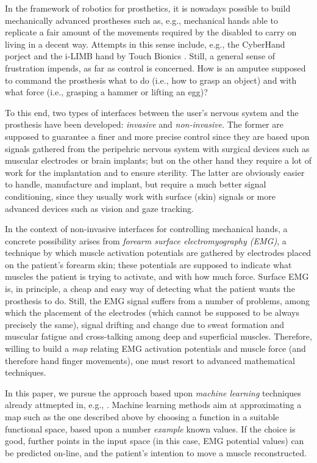 In the framework of robotics for prosthetics, it is nowadays possible
to build mechanically advanced prostheses such as, e.g., mechanical
hands able to replicate a fair amount of the movements required by the
disabled to carry on living in a decent way. Attempts in this sense
include, e.g., the CyberHand porject \cite{...} and the i-LIMB hand by
Touch Bionics \cite{}. Still, a general sense of frustration impends,
as far as control is concerned. How is an amputee supposed to command
the prosthesis what to do (i.e., how to grasp an object) and with what
force (i.e., grasping a hammer or lifting an egg)?

To this end, two types of interfaces between the user's nervous system
and the prosthesis have been developed: \emph{invasive} and
\emph{non-invasive}. The former are supposed to guarantee a finer and
more precise control since they are based upon signals gathered from
the peripehric nervous system with surgical devices such as muscular
electrodes or brain implants; but on the other hand they require a lot
of work for the implantation and to ensure sterility.  The latter are
obviously easier to handle, manufacture and implant, but require a
much better signal conditioning, since they usually work with surface
(skin) signals or more advanced devices such as vision and gaze
tracking.

In the context of non-invasive interfaces for controlling mechanical
hands, a concrete possibility arises from \emph{forearm surface
electromyography (EMG)}, a technique by which muscle activation
potentials are gathered by electrodes placed on the patient's forearm
skin; these potentials are supposed to indicate what muscles the
patient is trying to activate, and with how much force. Surface EMG
is, in principle, a cheap and easy way of detecting what the patient
wants the prosthesis to do. Still, the EMG signal suffers from a
number of problems, among which the placement of the electrodes (which
cannot be supposed to be always precisely the same), signal drifting
and change due to sweat formation and muscular fatigue and
cross-talking among deep and superficial muscles. Therefore, willing
to build a \emph{map} relating EMG activation potentials and muscle
force (and therefore hand finger movements), one must resort to
advanced mathematical techniques.

In this paper, we pursue the approach based upon \emph{machine
learning} techniques already attmepted in, e.g., \cite{smagt}. Machine
learning methods aim at approximating a map such as the one described
above by choosing a function in a suitable functional space, based
upon a number \emph{example} known values. If the choice is good,
further points in the input space (in this case, EMG potential values)
can be predicted on-line, and the patient's intention to move a muscle
reconstructed.

